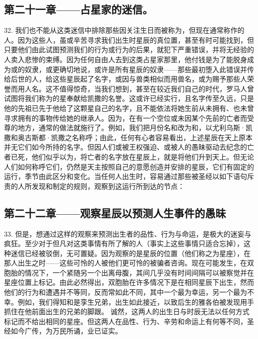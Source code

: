 \subsection{第二十一章——占星家的迷信。}

32. 我们也不能从这类迷信中排除那些因关注生日而被称为，但现在通常称作的人。因为这些人，虽或辛苦寻求我们出生时星辰的真位置，甚至有时可能找到，但只要他们由此试图预测我们的行为或行为的后果，就犯下严重错误，并将无经验的人卖入悲惨的束缚。因为任何自由人去到这类占星家那里，他付钱是为了能脱身成为或的奴隶，或更确切地说，或许是所有星辰的奴隶——那些最初堕入此错误并传给后世的人，给这些星辰起了名字，或因与兽类相似而用兽名，或为赐予那些人荣誉而用人名。这不值得惊奇，当我们想到，甚至在较近我们自己的时代，罗马人曾试图将我们称为的星奉献给凯撒的名誉。这或许已经实行，且名字传至久远，只是他的先祖已先于他给了这颗星自己的名字，且不能依法将她生前从未拥有、也未曾寻求拥有的事物传给她的继承人。因为，在有一个空位或未因某个先前的亡者而受尊的地方，通常的做法就施行了。例如，我们把月份名和改为和，以尤利乌斯·凯撒和奥古斯都·凯撒之名称呼；由此，任何有心者容易看出，上述星辰在天上原本并无它们如今所持的名字。但因人们或被王权强迫、或被人的愚昧驱动去纪念的亡者已死，他们似乎以为，将亡者的名字放在星辰上，就是将他们升到天上。但无论人们如何称呼它们，仍然是天主按照自己的意愿创造并安排的星辰，它们有固定的运行，季节由此区分和变化。当任何人出生时，容易通过那些被圣经以如下语句斥责的人所发现和制定的规则，观察到这运行所到达的节点：\par


\subsection{第二十二章——观察星辰以预测人生事件的愚昧}

33. 但是，想通过这样的观察来预测出生者的品性、行为与命运，是极大的迷妄与疯狂。至少对于但凡对这类事情有所了解的人（事实上这些事情只适合忘掉），这种迷信已经被驳倒，无可置疑。因为观察的是星辰的位置（他们称之为星座），在那人出生之时——这些可怜的人被他们更可怜的被骗者咨询。现在可能发生，在双胞胎的情况下，一个紧随另一个出离母腹，其间几乎没有时间间隔可以被察觉并在星座位置上标记。由此必然得出，双胞胎在许多情况下是在相同星辰下出生，然而他们的行为和遭遇并不等同，反而常如此不同，其中一个最为幸运，另一个最为不幸。例如，我们得知和是孪生兄弟，出生如此接近，以致后生的雅各伯被发现用手抓住在他前面出生的兄弟的脚跟。 诚然，这两人的出生日与时辰无法以任何方式标记而不给出相同的星座。但这两人在品性、行为、辛劳和命运上有何等不同，圣经如今广传，为万民所诵，业已证实。\par

